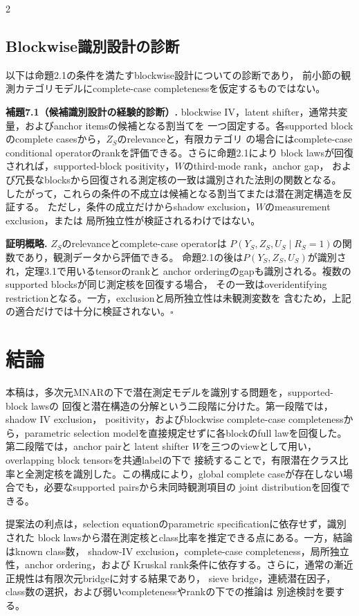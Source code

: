 \documentclass[a4paper,10pt]{article}
\begin{document}
\begin{multicols}{2}
\subsection{Blockwise識別設計の診断}
以下は命題2.1の条件を満たすblockwise設計についての診断であり，
前小節の観測カテゴリモデルにcomplete-case completenessを仮定するものではない。

\noindent\textbf{補題7.1（候補識別設計の経験的診断）.}
blockwise IV，latent shifter，通常共変量，およびanchor itemsの候補となる割当てを
一つ固定する。各supported blockのcomplete casesから，$Z_S$のrelevanceと，有限カテゴリ
の場合にはcomplete-case conditional operatorのrankを評価できる。さらに命題2.1により
block lawsが回復されれば，supported-block positivity，$W$のthird-mode rank，anchor gap，
および冗長なblocksから回復される測定核の一致は識別された法則の関数となる。
したがって，これらの条件の不成立は候補となる割当てまたは潜在測定構造を反証する。
ただし，条件の成立だけからshadow exclusion，$W$のmeasurement exclusion，または
局所独立性が検証されるわけではない。

\noindent\textbf{証明概略.}
$Z_S$のrelevanceとcomplete-case operatorは
$P(Y_S,Z_S,U_S\mid R_S=1)$の関数であり，観測データから評価できる。
命題2.1の後は$P(Y_S,Z_S,U_S)$が識別され，定理3.1で用いるtensorのrankと
anchor orderingのgapも識別される。複数のsupported blocksが同じ測定核を回復する場合，
その一致はoveridentifying restrictionとなる。一方，exclusionと局所独立性は未観測変数を
含むため，上記の適合だけでは十分に検証されない。\hfill$\square$

\section{結論}
本稿は，多次元MNARの下で潜在測定モデルを識別する問題を，supported-block lawsの
回復と潜在構造の分解という二段階に分けた。第一段階では，shadow IV exclusion，
positivity，およびblockwise complete-case completenessから，parametric selection
modelを直接規定せずに各blockのfull lawを回復した。第二段階では，anchor pairと
latent shifter $W$を三つのviewとして用い，overlapping block tensorsを共通labelの下で
接続することで，有限潜在クラス比率と全測定核を識別した。この構成により，global
complete caseが存在しない場合でも，必要なsupported pairsから未同時観測項目の
joint distributionを回復できる。

提案法の利点は，selection equationのparametric specificationに依存せず，識別された
block lawsから潜在測定核とclass比率を推定できる点にある。一方，結論はknown class数，
shadow-IV exclusion，complete-case completeness，局所独立性，anchor ordering，および
Kruskal rank条件に依存する。さらに，通常の漸近正規性は有限次元bridgeに対する結果であり，
sieve bridge，連続潜在因子，class数の選択，および弱いcompletenessやrankの下での推論は
別途検討を要する。


\end{multicols}
\end{document}
